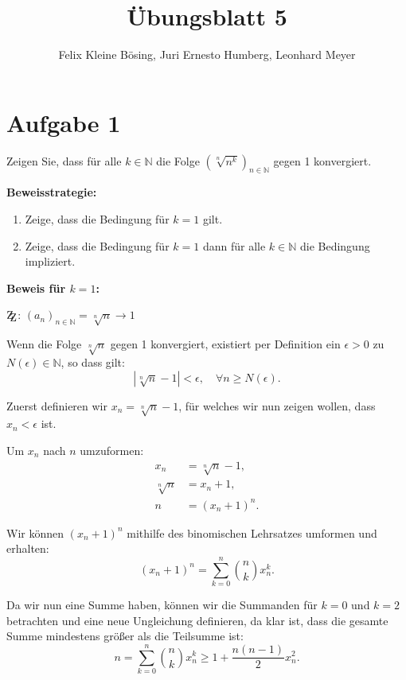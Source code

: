 \documentclass[11pt]{article}
\begin{document}
\title{Übungsblatt 5}
\author{Felix Kleine Bösing, Juri Ernesto Humberg, Leonhard Meyer}
\maketitle

\section*{Aufgabe 1}
Zeigen Sie, dass für alle \( k \in \mathbb{N} \) die Folge
\(\left( \sqrt[n]{n^k} \right)_{n \in \mathbb{N}}\) gegen 1 konvergiert.

\textbf{Beweisstrategie:}
\begin{enumerate}
    \item Zeige, dass die Bedingung für \(k = 1\) gilt.
    \item Zeige, dass die Bedingung für \(k = 1\) dann für alle \(k \in \mathbb{N}\) die Bedingung impliziert.
\end{enumerate}

\textbf{Beweis für \(k = 1\):}

\(\mathrm{Z\kern-.3em\raise-0.5ex\hbox{Z}}\): \((a_{n})_{n\in\mathbb{N}} = \sqrt[n]{n} \rightarrow 1\)

Wenn die Folge \(\sqrt[n]{n}\) gegen 1 konvergiert, existiert per Definition ein \(\epsilon > 0\) zu \(N(\epsilon) \in \mathbb{N}\), so dass gilt:
\[
|\sqrt[n]{n} - 1| < \epsilon, \quad \forall n \geq N(\epsilon).
\]

Zuerst definieren wir \( x_{n} = \sqrt[n]{n} - 1 \), für welches wir nun zeigen wollen, dass \( x_{n} < \epsilon \) ist.

Um \( x_{n} \) nach \(n\) umzuformen:
\begin{align*}
    x_{n} &= \sqrt[n]{n} - 1, \\
    \sqrt[n]{n} &= x_{n} + 1, \\
    n &= (x_{n} + 1)^{n}.
\end{align*}

Wir können \((x_{n} + 1)^{n}\) mithilfe des binomischen Lehrsatzes umformen und erhalten:
\[
(x_{n} + 1)^{n} = \sum_{k=0}^{n} \binom{n}{k} x_{n}^{k}.
\]

Da wir nun eine Summe haben, können wir die Summanden für \(k = 0\) und \(k = 2\) betrachten und eine neue Ungleichung definieren, da klar ist, dass die gesamte Summe mindestens größer als die Teilsumme ist:
\[
n = \sum_{k=0}^{n} \binom{n}{k} x_{n}^{k} \geq 1 + \frac{n(n-1)}{2} x_{n}^{2}.
\]
\end{document}
